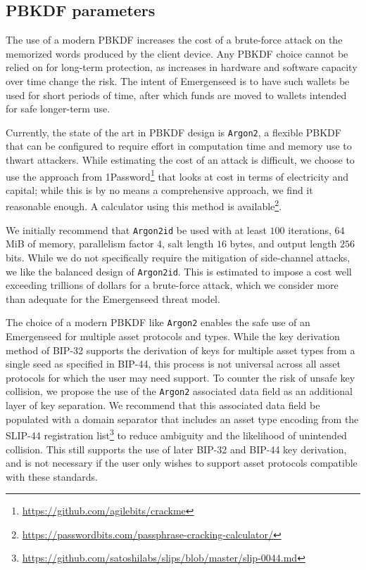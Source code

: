 \documentclass{article}
\begin{document}
\subsection{PBKDF parameters}

The use of a modern PBKDF increases the cost of a brute-force attack on the memorized words produced by the client device.
Any PBKDF choice cannot be relied on for long-term protection, as increases in hardware and software capacity over time change the risk.
The intent of Emergenseed is to have such wallets be used for short periods of time, after which funds are moved to wallets intended for safe longer-term use.

Currently, the state of the art in PBKDF design is \texttt{Argon2}, a flexible PBKDF that can be configured to require effort in computation time and memory use to thwart attackers.
While estimating the cost of an attack is difficult, we choose to use the approach from 1Password\footnote{\url{https://github.com/agilebits/crackme}} that looks at cost in terms of electricity and capital; while this is by no means a comprehensive approach, we find it reasonable enough.
A calculator using this method is available\footnote{\url{https://passwordbits.com/passphrase-cracking-calculator/}}.

We initially recommend that \texttt{Argon2id} be used with at least $100$ iterations, $64$ MiB of memory, parallelism factor $4$, salt length $16$ bytes, and output length $256$ bits.
While we do not specifically require the mitigation of side-channel attacks, we like the balanced design of \texttt{Argon2id}.
This is estimated to impose a cost well exceeding trillions of dollars for a brute-force attack, which we consider more than adequate for the Emergenseed threat model.

The choice of a modern PBKDF like \texttt{Argon2} enables the safe use of an Emergenseed for multiple asset protocols and types.
While the key derivation method of BIP-32 supports the derivation of keys for multiple asset types from a single seed as specified in BIP-44, this process is not universal across all asset protocols for which the user may need support.
To counter the risk of unsafe key collision, we propose the use of the \texttt{Argon2} associated data field as an additional layer of key separation.
We recommend that this associated data field be populated with a domain separator that includes an asset type encoding from the SLIP-44 registration list\footnote{\url{https://github.com/satoshilabs/slips/blob/master/slip-0044.md}} to reduce ambiguity and the likelihood of unintended collision.
This still supports the use of later BIP-32 and BIP-44 key derivation, and is not necessary if the user only wishes to support asset protocols compatible with these standards.
\end{document}

